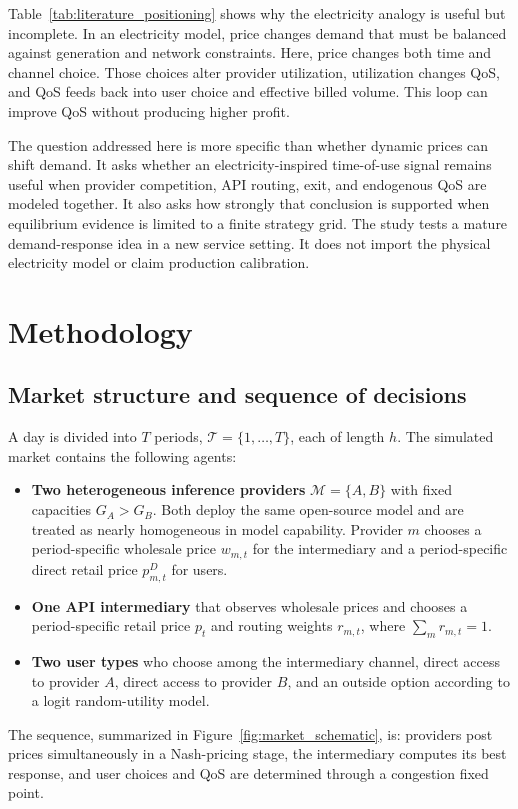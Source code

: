\documentclass[11pt,a4paper]{article}
\newcommand{\T}{\mathcal{T}}
\newcommand{\M}{\mathcal{M}}
\begin{document}
Table~\ref{tab:literature_positioning} shows why the electricity analogy is useful but incomplete. In an electricity model, price changes demand that must be balanced against generation and network constraints. Here, price changes both time and channel choice. Those choices alter provider utilization, utilization changes QoS, and QoS feeds back into user choice and effective billed volume. This loop can improve QoS without producing higher profit.

The question addressed here is more specific than whether dynamic prices can shift demand. It asks whether an electricity-inspired time-of-use signal remains useful when provider competition, API routing, exit, and endogenous QoS are modeled together. It also asks how strongly that conclusion is supported when equilibrium evidence is limited to a finite strategy grid. The study tests a mature demand-response idea in a new service setting. It does not import the physical electricity model or claim production calibration.

\section{Methodology}
\label{sec:model}

\subsection{Market structure and sequence of decisions}

A day is divided into $T$ periods, $\T=\{1,\ldots,T\}$, each of length $h$. The simulated market contains the following agents:
\begin{itemize}[leftmargin=2em]
  \item \textbf{Two heterogeneous inference providers} $\M=\{A,B\}$ with fixed capacities $G_A>G_B$. Both deploy the same open-source model and are treated as nearly homogeneous in model capability. Provider $m$ chooses a period-specific wholesale price $w_{m,t}$ for the intermediary and a period-specific direct retail price $p^D_{m,t}$ for users.
  \item \textbf{One API intermediary} that observes wholesale prices and chooses a period-specific retail price $p_t$ and routing weights $r_{m,t}$, where $\sum_m r_{m,t}=1$.
  \item \textbf{Two user types} who choose among the intermediary channel, direct access to provider $A$, direct access to provider $B$, and an outside option according to a logit random-utility model.
\end{itemize}
The sequence, summarized in Figure~\ref{fig:market_schematic}, is: providers post prices simultaneously in a Nash-pricing stage, the intermediary computes its best response, and user choices and QoS are determined through a congestion fixed point.
\end{document}
